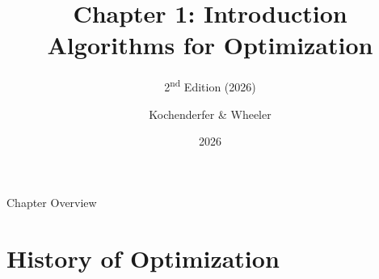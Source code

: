 \documentclass[aspectratio=169,10pt]{beamer}
\title[Ch.\,1 Introduction]{%
  \textbf{Chapter 1: Introduction}\\
  \normalsize Algorithms for Optimization}
\subtitle{2\textsuperscript{nd} Edition (2026)}
\author{Kochenderfer \& Wheeler}
\institute{MIT Press}
\date{2026}
\begin{document}
\begin{frame}
  \titlepage
\end{frame}

\begin{frame}{Chapter Overview}
  \tableofcontents
\end{frame}


\section{History of Optimization}
\end{document}
